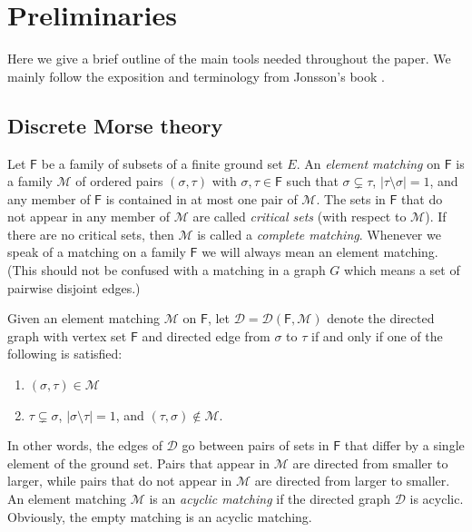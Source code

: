 \documentclass[10pt]{amsart}
\theoremstyle{definition}
\begin{document}
	\section{Preliminaries} \label{tools}
	
	Here we give a brief outline of the main tools needed throughout the paper. We mainly follow the exposition and terminology from Jonsson's book \cite{jonsson_complex_graph}.
	
	\subsection{Discrete Morse theory} 
	Let $\mathsf{F}$ be a family of subsets of a finite ground set $E$. An {\em element matching} on $\mathsf{F}$ is a family $\mathcal{M}$ of ordered pairs $(\sigma, \tau)$ with $\sigma, \tau\in \mathsf{F}$ such that $\sigma\subsetneq \tau$, $|\tau\setminus\sigma|=1$, and any member of $\mathsf{F}$ is contained in at most one pair of $\mathcal{M}$. The sets in $\mathsf{F}$ that do not appear in any member of $\mathcal{M}$ are called {\em critical sets} (with respect to $\mathcal{M}$). If there are no critical sets, then $\mathcal{M}$ is called a {\em complete matching}. Whenever we speak of a matching on a family $\mathsf{F}$ we will always mean an element matching. (This should not be confused with a matching in a graph $G$ which means a set of pairwise disjoint edges.)
	
	Given an element matching $\mathcal{M}$ on $\mathsf{F}$, let $\mathcal{D} = \mathcal{D}(\mathsf{F}, \mathcal{M})$ denote the directed graph with vertex set $\mathsf{F}$ and directed edge from $\sigma$ to $\tau$ if and only if one of the following is satisfied:
	\begin{enumerate}
		\item $(\sigma, \tau)\in \mathcal{M}$
		\item $\tau\subsetneq \sigma$,  $|\sigma\setminus \tau|=1$, and $(\tau,\sigma)\notin \mathcal{M}$.
	\end{enumerate}
	
	In other words, the edges of $\mathcal{D}$ go between pairs of sets in $\mathsf{F}$ that differ by a single element of the ground set. Pairs that appear in $\mathcal{M}$ are directed from smaller to larger, while pairs that do not appear in $\mathcal{M}$ are directed from larger to smaller.  
	An element matching $\mathcal{M}$ is an {\em acyclic matching} if the directed graph $\mathcal{D}$ %
	is acyclic. Obviously, the empty matching is an acyclic matching.
	
\end{document}
